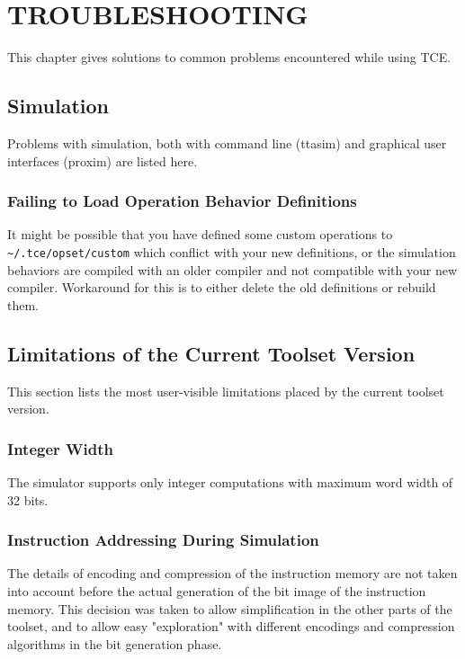 \documentclass[twoside]{tceusermanual}
\begin{document}
\chapter{TROUBLESHOOTING}
\label{chapter:troubleshooting}

This chapter gives solutions to common problems encountered while using TCE.

\section{Simulation}

Problems with simulation, both with command line (ttasim) and graphical
user interfaces (proxim) are listed here.

\subsection{Failing to Load Operation Behavior Definitions}

It might be possible that you have defined some custom operations to
\verb|~/.tce/opset/custom| which conflict with your new definitions, or the
simulation behaviors are compiled with an older compiler and not compatible
with your new compiler. Workaround for this is to either delete the old
definitions or rebuild them.

\section{Limitations of the Current Toolset Version}

This section lists the most user-visible limitations placed by the current
toolset version.

\subsection{Integer Width}

The simulator supports only integer computations with maximum word width of
32 bits. 

\subsection{Instruction Addressing During Simulation}

The details of encoding and compression of the instruction memory are not
taken into account before the actual generation of the bit image of the
instruction memory. This decision was taken to allow simplification in the
other parts of the toolset, and to allow easy "exploration" with different
encodings and compression algorithms in the bit generation phase.
\end{document}
